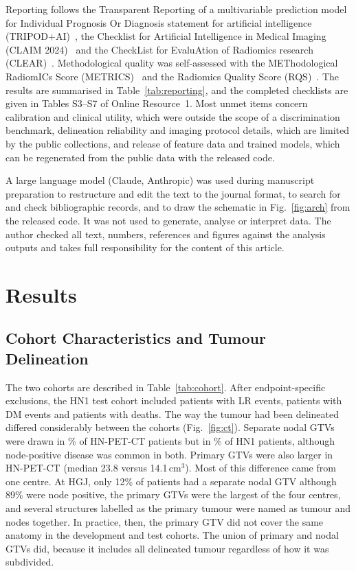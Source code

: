 \documentclass[pdflatex,iicol,sn-nature]{sn-jnl}
\begin{document}
Reporting follows the Transparent Reporting of a multivariable prediction model for Individual Prognosis Or Diagnosis statement for artificial intelligence (TRIPOD+AI)~\cite{collins2024tripodai}, the Checklist for Artificial Intelligence in Medical Imaging (CLAIM 2024)~\cite{tejani2024claim} and the CheckList for EvaluAtion of Radiomics research (CLEAR)~\cite{kocak2023clear}. Methodological quality was self-assessed with the METhodological RadiomICs Score (METRICS)~\cite{kocak2024metrics} and the Radiomics Quality Score (RQS)~\cite{lambin2017rqs}. The results are summarised in Table~\ref{tab:reporting}, and the completed checklists are given in Tables S3--S7 of Online Resource~1. Most unmet items concern calibration and clinical utility, which were outside the scope of a discrimination benchmark, delineation reliability and imaging protocol details, which are limited by the public collections, and release of feature data and trained models, which can be regenerated from the public data with the released code.

A large language model (Claude, Anthropic) was used during manuscript preparation to restructure and edit the text to the journal format, to search for and check bibliographic records, and to draw the schematic in Fig.~\ref{fig:arch} from the released code. It was not used to generate, analyse or interpret data. The author checked all text, numbers, references and figures against the analysis outputs and takes full responsibility for the content of this article.



\section{Results}\label{sec:results}

\subsection{Cohort Characteristics and Tumour Delineation}\label{sec:res-cohort}
The two cohorts are described in Table~\ref{tab:cohort}. After endpoint-specific exclusions, the HN1 test cohort included \nTestLR{} patients with \eTestLR{} LR events, \nTestDM{} patients with \eTestDM{} DM events and \nTestOS{} patients with \eTestOS{} deaths. The way the tumour had been delineated differed considerably between the cohorts (Fig.~\ref{fig:ct}). Separate nodal GTVs were drawn in \nodalPctCan\% of HN-PET-CT patients but in \nodalPctMAA\% of HN1 patients, although node-positive disease was common in both. Primary GTVs were also larger in HN-PET-CT (median 23.8 versus 14.1\,cm$^3$). Most of this difference came from one centre. At HGJ, only 12\% of patients had a separate nodal GTV although 89\% were node positive, the primary GTVs were the largest of the four centres, and several structures labelled as the primary tumour were named as tumour and nodes together. In practice, then, the primary GTV did not cover the same anatomy in the development and test cohorts. The union of primary and nodal GTVs did, because it includes all delineated tumour regardless of how it was subdivided.
\end{document}
